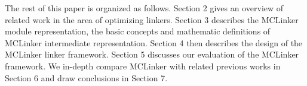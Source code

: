 The rest of this paper is organized as follows. Section 2 gives an overview of related work in the area of optimizing linkers. Section 3 describes the MCLinker module representation, the basic concepts and mathematic definitions of MCLinker intermediate representation. Section 4 then describes the design of the MCLinker linker framework. Section 5 discusses our evaluation of the MCLinker framework. We in-depth compare MCLinker with related previous works in Section 6 and draw conclusions in Section 7.
